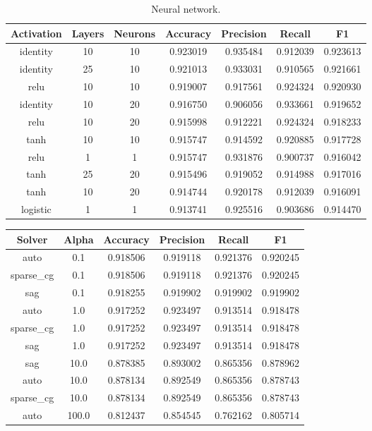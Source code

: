 \begin{appendices}
\begin{table}
\begin{tabular*}{1.2\textwidth }{c @{\extracolsep{\fill}} cccccc}
\toprule
Activation & Layers & Neurons &  Accuracy &  Precision &    Recall &        F1 \\
\midrule
identity   & 10     &      10 &  0.923019 &   0.935484 &  0.912039 &  0.923613 \\
identity   & 25     &      10 &  0.921013 &   0.933031 &  0.910565 &  0.921661 \\
relu       & 10     &      10 &  0.919007 &   0.917561 &  0.924324 &  0.920930 \\
identity   & 10     &      20 &  0.916750 &   0.906056 &  0.933661 &  0.919652 \\
relu       & 10     &      20 &  0.915998 &   0.912221 &  0.924324 &  0.918233 \\
tanh       & 10     &      10 &  0.915747 &   0.914592 &  0.920885 &  0.917728 \\
relu       & 1      &       1 &  0.915747 &   0.931876 &  0.900737 &  0.916042 \\
tanh       & 25     &      20 &  0.915496 &   0.919052 &  0.914988 &  0.917016 \\
tanh       & 10     &      20 &  0.914744 &   0.920178 &  0.912039 &  0.916091 \\
logistic   & 1      &       1 &  0.913741 &   0.925516 &  0.903686 &  0.914470 \\
\bottomrule

\end{tabular*}
\caption{\label{tab:Neural network}Neural network.}
\end{table}

\begin{table}
\begin{tabular*}{\textwidth}{c @{\extracolsep{\fill}} ccccc}

\toprule
Solver      &  Alpha &  Accuracy &  Precision &    Recall &        F1 \\
\midrule
auto        &    0.1 &  0.918506 &   0.919118 &  0.921376 &  0.920245 \\
sparse\_cg  &    0.1 &  0.918506 &   0.919118 &  0.921376 &  0.920245 \\
sag         &    0.1 &  0.918255 &   0.919902 &  0.919902 &  0.919902 \\
auto        &    1.0 &  0.917252 &   0.923497 &  0.913514 &  0.918478 \\
sparse\_cg  &    1.0 &  0.917252 &   0.923497 &  0.913514 &  0.918478 \\
sag         &    1.0 &  0.917252 &   0.923497 &  0.913514 &  0.918478 \\
sag         &   10.0 &  0.878385 &   0.893002 &  0.865356 &  0.878962 \\
auto        &   10.0 &  0.878134 &   0.892549 &  0.865356 &  0.878743 \\
sparse\_cg  &   10.0 &  0.878134 &   0.892549 &  0.865356 &  0.878743 \\
auto        &  100.0 &  0.812437 &   0.854545 &  0.762162 &  0.805714 \\
\bottomrule


\end{tabular*}
\end{table}
\end{appendices}
